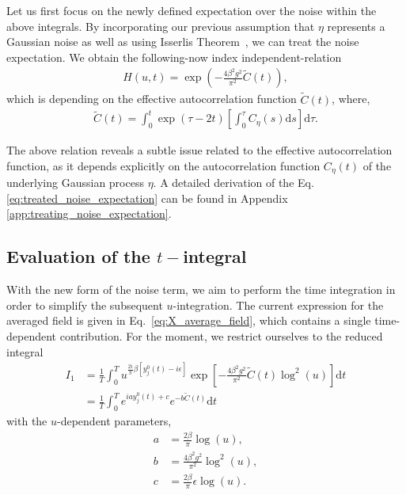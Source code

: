 \documentclass[reprint,amsmath,amssymb,aps]{revtex4-2}
\begin{document}
Let us first focus on the newly defined expectation over the noise within the above integrals. By incorporating our previous assumption that $\eta$ represents a Gaussian noise as well as using Isserlis Theorem~\cite{isserlis1918}, we can treat the noise expectation. We obtain the following-now index independent-relation
\begin{align}
   \label{eq:treated_noise_expectation} H(u,t)=\exp\left(-\frac{4 \beta^2 g^2}{\pi^2} \tilde{C}(t)\right),
\end{align}
which is depending on the effective autocorrelation function $\tilde{C}(t)$, where, 
\begin{align*}
    \tilde{C}(t)=\int_0^t\exp(\tau-2t)\left[\int_0^\tau C_{\eta}(s) \mathrm{d}s\right]\mathrm{d}\tau.
\end{align*}

The above relation reveals a subtle issue related to the effective autocorrelation function, as it depends explicitly on the autocorrelation function $C_{\eta}(t)$ of the underlying Gaussian process $\eta$. A detailed derivation of the Eq. \eqref{eq:treated_noise_expectation} can be found in Appendix \ref{app:treating_noise_expectation}.



\subsection{Evaluation of the $t-$integral}
With the new form of the noise term, we aim to perform the time integration in order to simplify the subsequent $u$-integration. The current expression for the averaged field is given in Eq.~\eqref{eq:X_average_field}, which contains a single time-dependent contribution. For the moment, we restrict ourselves to the reduced integral
\begin{align*}
     I_1
     &= 
    \frac{1}{T}
    \int_0^T  
   u^{\frac{2i}{\pi}\beta
    \left[y_j^0(t) - i \epsilon\right]}
    \exp\left[
    -\frac{4 \beta^2 g^2}{\pi^2}
    \tilde{C}(t)
    \log^2 (u)
    \right]
    \mathrm{d}t
    \\
    &= 
    \frac{1}{T}
    \int_0^T  
    e^{i a y_j^0(t) + c}
    e^{- b\tilde{C}(t)}
    \mathrm{d}t   
\end{align*}
with the $u$-dependent parameters,
\begin{align*}
    a
    &= 
    \frac{2\beta}{\pi} \log(u),\\
    b
    &=
    \frac{4 \beta^2 g^2}{\pi^2}
    \log^2(u),\\
    c
    &=
    \frac{2\beta}{\pi}\epsilon \log(u).
\end{align*}
\end{document}
